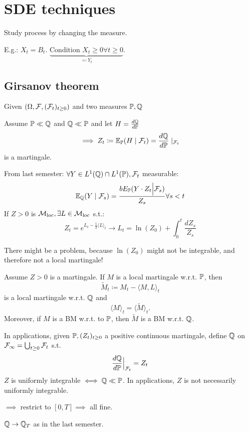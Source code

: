 \chapter{SDE techniques}

 Study process by changing the measure.

E.g.: $X_t=B_t$. $\underbrace{\text{Condition }X_t\geq 0\forall t\geq 0}_{\eqqcolon Y_t}$.



\section{Girsanov theorem}

Given $(\Omega,\mathcal{F},(\mathcal{F}_t)_{t\geq 0})$ and two measures $\mathbb{P},\mathbb{Q}$

Assume $\mathbb{P}\ll \mathbb{Q}$ and $\mathbb{Q}\ll\mathbb{P}$
and let $H=\frac{d\mathbb{Q}}{d\mathbb{P}}$
\[\implies Z_t\coloneqq \mathbb{E}_{\mathbb{P}}(H\mid \mathcal{F}_t)=\frac{d\mathbb{Q}}{d\mathbb{P}}\mid_{\mathcal{F}_t}\]
is a martingale.

From last semester: $\forall Y\in L^1(\mathbb{Q})\cap L^1(\mathbb{P}),\mathcal{F}_t$ measurable: %
\begin{equation*}
    \mathbb{E}_{\mathbb{Q}}(Y\mid \mathcal{F}_s)=\frac{bE_{\mathbb{P}}(Y\cdot Z_t\Big\vert\mathcal{F}_s)}{Z_s}\forall s<t
\end{equation*}
If $Z>0$ is $\mathcal{M}_{\text{loc}},\exists L \in\mathcal{M}_{\text{loc}}$ s.t.:
\[Z_t=e^{L_t-\frac{1}{2}\langle L\rangle_t}\to L_t = \ln(Z_0)+\int_0^t \frac{d Z_s}{Z_s}\] 

There might be a problem, because $\ln(Z_0)$ might not be integrable, and therefore not a local martingale!

\begin{theorem}[Girsanov]\label{thm:2.1:Girsanov}
    Assume $Z>0$ is a martingale. If $M$ is a local martingale w.r.t. $\mathbb{P}$, then 
    \[\tilde{M}_t\coloneqq M_t-\langle M,L\rangle_t\] is a local martingale w.r.t. $\mathbb{Q}$
    and \[\langle M\rangle_t=\langle \tilde{M}\rangle_t.\]
    Moreover, if $M$ is a BM w.r.t. to $\mathbb{P}$, then $\tilde{M}$ is a BM w.r.t. $\mathbb{Q}$.
\end{theorem}

\begin{remark}
    In applications, given $\mathbb{P},(Z_t)_{t\geq 0}$
    a positive continuous martingale, 
    define $\mathbb{Q}$ on $\mathcal{F}_\infty=\bigcup_{t\geq 0}\mathcal{F}_t$ s.t. 
    \[\frac{d\mathbb{Q}}{d\mathbb{P}}\Big\vert_{\mathcal{F}_t}=Z_t\]
    $Z$ is uniformly integrable $\iff \mathbb{Q}\ll\mathbb{P}$. 
     In applications, 
    $Z$ is not necessarily uniformly integrable.

    $\implies$ restrict to $[0,T]\implies$ all fine.

    $\mathbb{Q}\to\mathbb{Q}_T$ as in the last semester.
\end{remark}


